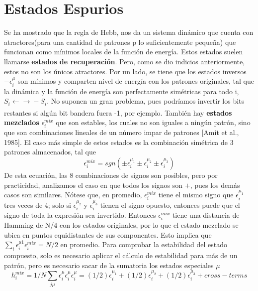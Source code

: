 \documentclass{article}
\begin{document}
\section{Estados Espurios}
Se ha mostrado que la regla de Hebb, nos da un sistema dinámico que cuenta con atractores(para una cantidad de patrones p lo suficientemente pequeña) que funcionan como mínimos locales de la función de energía. Estos estados suelen llamarse \textbf{estados de recuperación}. Pero, como se dio indicios anteriormente, estos no son los únicos atractores.
Por un lado, se tiene que los estados inversos $-\epsilon_i^\mu$ son mínimos y comparten nivel de energía con los patrones originales, tal que la dinámica y la función de energía son perfectamente simétricas para todo i, $S_i \xleftarrow[]{}\xrightarrow[]{}-S_i$. No suponen un gran problema, pues podríamos invertir los bits restantes si algún bit bandera fuera -1, por ejemplo.
También hay \textbf{estados mezclados}  $\epsilon_i^{mix}$ que son estables, los cuales no son iguales a ningún patrón, sino que son combinaciones lineales de un número impar de patrones [Amit et al., 1985]. El caso más simple de estos estados es la combinación simétrica de 3 patrones almacenados, tal que
\begin{equation}
    \epsilon_i^{mix} =  sgn(\pm\epsilon_i^{\mu_1}\pm\epsilon_i^{\mu_2}\pm\epsilon_i^{\mu_3})
    \label{2.32}
\end{equation}
De esta ecuación, las 8 combinaciones de signos son posibles, pero por practicidad, analizamos el caso en que todos los signos son $+$, pues los demás casos son similares. Nótese que, en promedio, $\epsilon_i^{mix}$ tiene el mismo signo que $\epsilon_i^{\mu_1}$ tres veces de 4; solo si $\epsilon_i^{\mu_2}$ y $\epsilon_i^{\mu_3}$ tienen el signo opuesto, entonces puede que el signo de toda la expresión sea invertido. Entonces $\epsilon_i^{mix}$ tiene una distancia de Hamming de N/4 con los estados originales, por lo que el estado mezclado se ubica en puntos equidistantes de sus componentes. Esto implica que $\sum_i \epsilon_i^{\mu 1} \epsilon_i^{mix} = N/2$ en promedio. Para comprobar la estabilidad del estado compuesto, solo es necesario aplicar el cálculo de estabilidad para más de un patrón, pero es necesario sacar de la sumatoria los estados especiales $\mu$
\begin{equation}
    h_i^{mix} = 1/N \sum_{j\mu}\epsilon_i^{\mu}\epsilon_i^{\mu}\epsilon_i^{\mu} = 
    (1/2)\epsilon_i^{\mu_1}+(1/2)\epsilon_i^{\mu_2}+ (1/2)\epsilon_i^{\mu_3} + cross-terms
    \label{2.323}
\end{equation}
\end{document}
